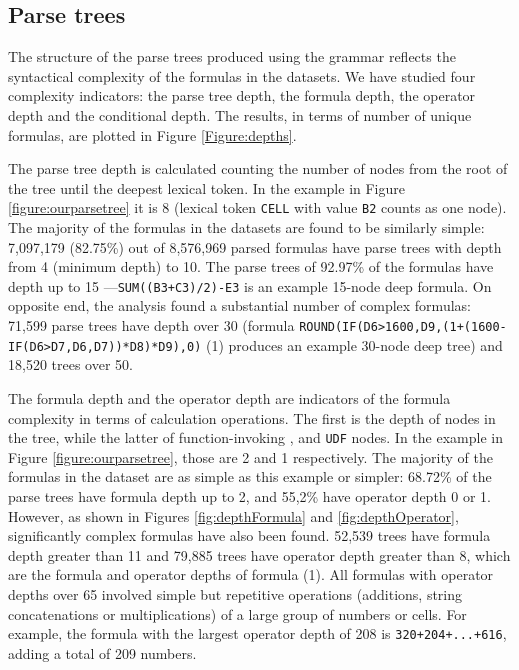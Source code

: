 \documentclass[times]{smrauth}
\begin{document}
\subsection{Parse trees}

The structure of the parse trees produced using the grammar reflects the syntactical complexity of the formulas in the datasets. We have studied four complexity indicators: the parse tree depth, the formula depth, the operator depth and the conditional depth. The results, in terms of number of unique formulas, are plotted in Figure \ref{Figure:depths}.

The parse tree depth is calculated counting the number of nodes from the root of the tree until the deepest lexical token. In the example in Figure \ref{figure:ourparsetree} it is 8 (lexical token \texttt{CELL} with value \texttt{B2} counts as one node). The majority of the formulas in the datasets are found to be similarly simple: 7,097,179 (82.75\%)
out of 8,576,969 parsed formulas have parse trees with depth from 4 (minimum depth) to 10. The parse trees of 92.97\% of the formulas have depth up to 15 ---\texttt{SUM((B3+C3)/2)-E3} is an example 15-node deep formula. On opposite end, the analysis found a substantial number of complex formulas: 71,599 parse trees have depth over 30 (formula \texttt{ROUND(IF(D6>1600,D9,(1+(1600-IF(D6>D7,D6,D7))*D8)*D9),0)} (1) produces an example 30-node deep tree) and 18,520 trees over 50.

The formula depth and the operator depth are indicators of the formula complexity in terms of calculation operations. The first is the depth of  nodes in the tree, while the latter of function-invoking  ,  and \texttt{UDF} nodes. In the example in Figure \ref{figure:ourparsetree}, those are 2 and 1 respectively. The majority of the formulas in the dataset are as simple as this example or simpler: 68.72\% of the parse trees have formula depth up to 2, and 55,2\% have operator depth 0 or 1. However, as shown in Figures \ref{fig:depthFormula} and \ref{fig:depthOperator}, significantly complex formulas have also been found. 52,539 trees have formula depth greater than 11 and 79,885 trees have operator depth greater than 8, which are the formula and operator depths of formula (1). All formulas with operator depths over 65 involved simple but repetitive operations (additions, string concatenations or multiplications) of a large group of numbers or cells. For example, the formula with the largest operator depth of 208 is \texttt{320+204+...+616}, adding a total of 209 numbers.
\end{document}
